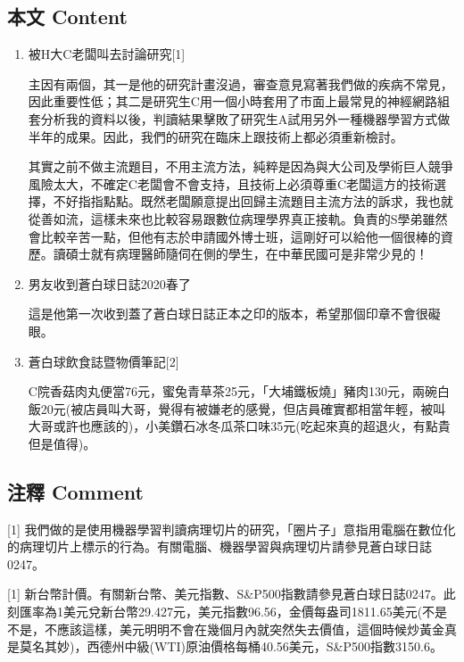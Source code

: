 \documentclass[
]{article}
\begin{document}
\hypertarget{ux672cux6587-content-7}{%
\subsection{本文 Content}\label{ux672cux6587-content-7}}

\begin{enumerate}
\def\labelenumi{\arabic{enumi}.}
\item
  被H大C老闆叫去討論研究{[}1{]}

  主因有兩個，其一是他的研究計畫沒過，審查意見寫著我們做的疾病不常見，因此重要性低；其二是研究生C用一個小時套用了市面上最常見的神經網路組套分析我的資料以後，判讀結果擊敗了研究生A試用另外一種機器學習方式做半年的成果。因此，我們的研究在臨床上跟技術上都必須重新檢討。

  其實之前不做主流題目，不用主流方法，純粹是因為與大公司及學術巨人競爭風險太大，不確定C老闆會不會支持，且技術上必須尊重C老闆這方的技術選擇，不好指指點點。既然老闆願意提出回歸主流題目主流方法的訴求，我也就從善如流，這樣未來也比較容易跟數位病理學界真正接軌。負責的S學弟雖然會比較辛苦一點，但他有志於申請國外博士班，這剛好可以給他一個很棒的資歷。讀碩士就有病理醫師隨伺在側的學生，在中華民國可是非常少見的！
\item
  男友收到蒼白球日誌2020春了

  這是他第一次收到蓋了蒼白球日誌正本之印的版本，希望那個印章不會很礙眼。
\item
  蒼白球飲食誌暨物價筆記{[}2{]}

  C院香菇肉丸便當76元，蜜兔青草茶25元，「大埔鐵板燒」豬肉130元，兩碗白飯20元(被店員叫大哥，覺得有被嫌老的感覺，但店員確實都相當年輕，被叫大哥或許也應該的)，小美鑽石冰冬瓜茶口味35元(吃起來真的超退火，有點貴但是值得)。
\end{enumerate}

\hypertarget{ux6ce8ux91cb-comment-7}{%
\subsection{注釋 Comment}\label{ux6ce8ux91cb-comment-7}}

{[}1{]}
我們做的是使用機器學習判讀病理切片的研究，「圈片子」意指用電腦在數位化的病理切片上標示的行為。有關電腦、機器學習與病理切片請參見蒼白球日誌0247。

{[}1{]}
新台幣計價。有關新台幣、美元指數、S\&P500指數請參見蒼白球日誌0247。此刻匯率為1美元兌新台幣29.427元，美元指數96.56，金價每盎司1811.65美元(不是不是，不應該這樣，美元明明不會在幾個月內就突然失去價值，這個時候炒黃金真是莫名其妙)，西德州中級(WTI)原油價格每桶40.56美元，S\&P500指數3150.6。
\end{document}
